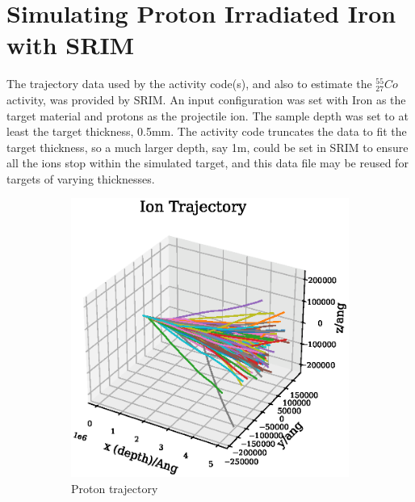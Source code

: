 \section[Simulating with SRIM - Iron]{Simulating Proton Irradiated Iron with SRIM}

The trajectory data used by the activity code(s), and also to estimate the ${}^{55}_{27} Co$ activity, was provided by SRIM.  An input configuration was set with Iron as the target material and protons as the projectile ion.  The sample depth was set to at least the target thickness, 0.5mm.  The activity code truncates the data to fit the target thickness, so a much larger depth, say 1m, could be set in SRIM to ensure all the ions stop within the simulated target, and this data file may be reused for targets of varying thicknesses.

\begin{figure}[htb]
\centering
\begin{subfigure}{0.49\textwidth}
  \includegraphics[width=\linewidth]{chapters/activity_code/images/trajectory_3d_500um.eps}
  \caption{Proton trajectory}
  \label{fig:iontrajectory1}
\end{subfigure}\hfil
\begin{subfigure}{0.49\textwidth}

\end{subfigure}
\end{figure}
